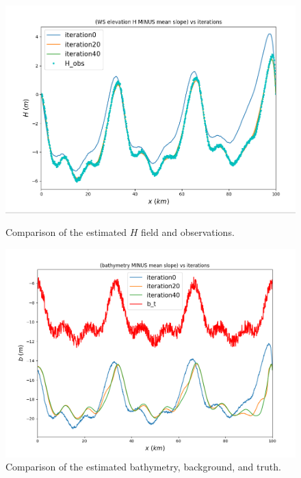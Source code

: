 \documentclass{article}
\begin{document}
\begin{figure}[H]
    \vspace{0.5cm}
    
    \begin{minipage}[b]{0.48\linewidth}
        \centering
        \includegraphics[width=\linewidth]{Images_Ayoub/With_Regularisation/Gradient/H_Comparaison.png}
        \caption{Comparison of the estimated \( H \) field and observations.}
        \label{fig:grad-h}
    \end{minipage}
    \hfill
    \begin{minipage}[b]{0.48\linewidth}
        \centering
        \includegraphics[width=\linewidth]{Images_Ayoub/With_Regularisation/Gradient/b_Comparaison.png}
        \caption{Comparison of the estimated bathymetry, background, and truth.}
        \label{fig:grad-b}
    \end{minipage}
    

\end{figure}
\end{document}

